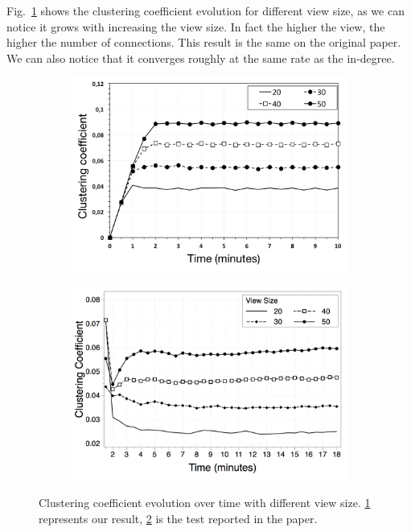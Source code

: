 Fig.~\ref{fig:clustering_coefficient_evolution} shows the clustering coefficient evolution for different view size, as we can notice it grows with increasing the view size. In fact the higher the view, the higher the number of connections. This result is the same on the original paper. We can also notice that it converges roughly at the same rate as the in-degree.

\begin{figure}
\centering
\begin{subfigure}{.5\textwidth}
  \centering
  \includegraphics[keepaspectratio=true, width=1\linewidth]{images/clustering_coefficient_evolution}
  \caption{}
  \label{fig:clustering_coefficient_evolution}
\end{subfigure}%
\begin{subfigure}{.5\textwidth}
  \centering
  \includegraphics[keepaspectratio=true, width=1\linewidth]{images/paper_clustering_coefficient_evolution}
  \caption{}
  \label{fig:paper_clustering_coefficient_evolution}
\end{subfigure}
\caption{Clustering coefficient evolution over time with different view size. \ref{fig:clustering_coefficient_evolution} represents our result, \ref{fig:paper_clustering_coefficient_evolution} is the test reported in the paper.}
\label{fig:randomness_clustering}
\end{figure}


